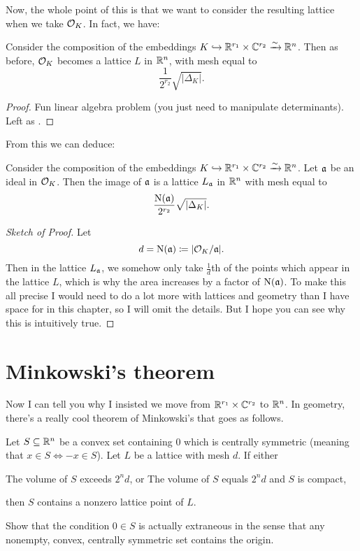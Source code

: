 Now, the whole point of this is that we want to consider the resulting lattice
when we take $\mathcal O_K$. In fact, we have:
\begin{lemma}
	\label{lem:vol_OK_mesh}
	Consider the composition of the embeddings $K \hookrightarrow \mathbb R^{r_1} \times \mathbb C^{r_2} \xrightarrow{\sim} \mathbb R^n$.
	Then as before, $\mathcal O_K$ becomes a lattice $L$ in $\mathbb R^n$, with mesh equal to
	\[ \frac{1}{2^{r_2}} \sqrt{\left\lvert \Delta_K \right\rvert}. \]
\end{lemma}
\begin{proof}
	Fun linear algebra problem (you just need to manipulate determinants).
	Left as .
\end{proof}
From this we can deduce:
\begin{lemma}
	Consider the composition of the embeddings $K \hookrightarrow \mathbb R^{r_1} \times \mathbb C^{r_2} \xrightarrow{\sim} \mathbb R^n$.
	Let $\mathfrak a$ be an ideal in $\mathcal O_K$.
	Then the image of $\mathfrak a$ is a lattice $L_\mathfrak a$ in $\mathbb R^n$ with mesh equal to
	\[ \frac{\operatorname{N}(\mathfrak a)}{2^{r_2}} \sqrt{\left\lvert \Delta_K \right\rvert}. \]
\end{lemma}
\begin{proof}[Sketch of Proof]
	Let \[ d = \operatorname{N}(\mathfrak a) \coloneqq |\mathcal O_K / \mathfrak a|. \]
	Then in the lattice $L_\mathfrak a$, we somehow only take $\frac 1d$th of the points
	which appear in the lattice $L$, which is why the area increases by a factor of $\operatorname{N}(\mathfrak a)$.
	To make this all precise I would need to do a lot more with lattices and geometry
	than I have space for in this chapter, so I will omit the details.
	But I hope you can see why this is intuitively true.
\end{proof}

\section{Minkowski's theorem}
Now I can tell you why I insisted we move from $\mathbb R^{r_1} \times \mathbb C^{r_2}$ to $\mathbb R^n$.
In geometry, there's a really cool theorem of Minkowski's that goes as follows.
\begin{theorem}
	[Minkowski]
	Let $S \subseteq \mathbb R^n$ be a convex set containing $0$
	which is centrally symmetric (meaning that $x \in S \iff -x \in S$).
	Let $L$ be a lattice with mesh $d$.
	If either
	\begin{enumerate}[(a)]
		\ii The volume of $S$ exceeds $2^n d$, or
		\ii The volume of $S$ equals $2^n d$ and $S$ is compact,
	\end{enumerate}
	then $S$ contains a nonzero lattice point of $L$.
\end{theorem}
\begin{ques}
	Show that the condition $0 \in S$ is actually extraneous
	in the sense that any nonempty, convex, centrally symmetric set contains the origin.
\end{ques}

